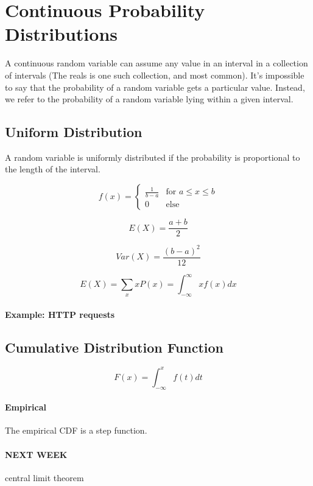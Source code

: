 \documentclass[a4paper]{article}
\begin{document}
\section{Continuous Probability Distributions}
A continuous random variable can assume any value in an interval in a collection of intervals (The reals is one such collection, and most common). It's impossible to say that the probability of a random variable gets a particular value. Instead, we refer to the probability of a random variable lying within a given interval.

\subsection{Uniform Distribution}
A random variable is uniformly distributed if the probability is proportional to the length of the interval.

\[
f(x)=
\begin{cases}
\frac{1}{b-a} & \text{for }a\le x\le b \\
0 & \text{else}
\end{cases}
\]

\[E(X)=\frac{a+b}{2}\]

\[Var(X)=\frac{(b-a)^2}{12}\]

\[E(X)=\sum_x xP(x)=\int_{-\infty}^\infty xf(x)dx\]


\paragraph{Example: HTTP requests}

\subsection{Cumulative Distribution Function}

\[F(x)=\int_{-\infty}^x f(t)dt\]


\paragraph{Empirical}
The empirical CDF is a step function.

\paragraph{NEXT WEEK}
central limit theorem
\end{document}
